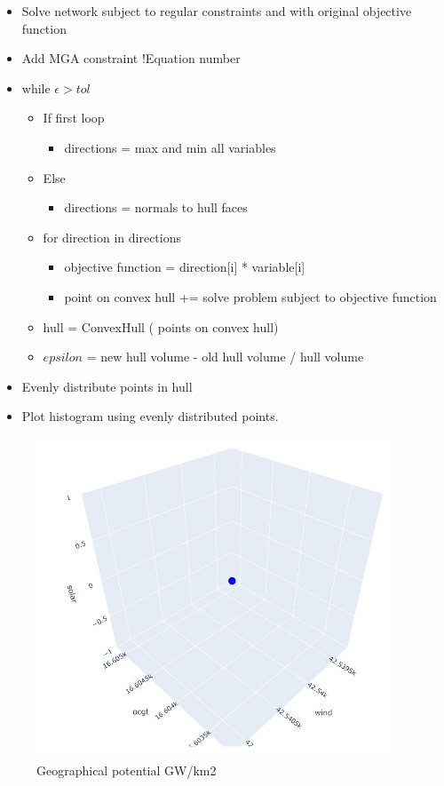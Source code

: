 \begin{itemize}[label={}]
	\item Solve network subject to regular constraints and with original objective function
	\item Add MGA constraint !Equation number
	\item while $\epsilon>tol$
	\begin{itemize}[label={}]
		\item If first loop
		\begin{itemize}[label={}]
			\item directions = max and min all variables
		\end{itemize}
		\item Else
		\begin{itemize}[label={}]
			\item directions = normals to hull faces
		\end{itemize}
		\item for direction in directions
		\begin{itemize}[label={}]
			\item objective function = direction[i] * variable[i]
			\item point on convex hull += solve problem subject to objective function
		\end{itemize}
		\item hull = ConvexHull ( points on convex hull)
		\item $epsilon$ = new hull volume - old hull volume / hull volume
	\end{itemize}
	\item Evenly distribute points in hull 
	\item Plot histogram using evenly distributed points. 
\end{itemize}


\begin{figure}[H]\centering
	\includegraphics[width=0.95\textwidth]{./Images/step1}
	\caption{Geographical potential GW/km2}
	\label{fig:step1}
\end{figure}

